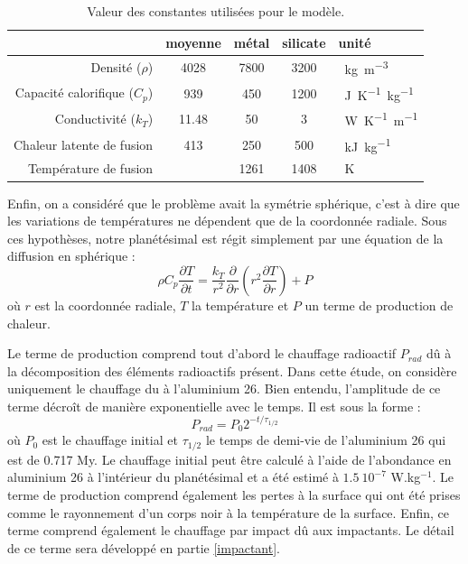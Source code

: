 \documentclass[10pt,a4paper]{article}
\numberwithin{equation}{section}
\begin{document}
\tabulinesep=0.3mm
\begin{table}[h!]
  \center
  \begin{tabu}{ r | c c c l}
     & moyenne & métal & silicate & unité\\ \hline
    Densité ($\rho$) & 4028 & 7800 &  3200 & \SI{}{kg.m^{-3}}\\ \hline
    Capacité calorifique ($C_p$) & 939 & 450 & 1200 &  \SI{}{J.K^{-1}.kg^{-1}} \\ \hline
    Conductivité ($k_T$)& 11.48 & 50 & 3 & \SI{}{W.K^{-1}.m^{-1}}  \\ \hline    
    Chaleur latente de fusion & 413 & 250 & 500 & \SI{}{kJ.kg^{-1}}\\ \hline
    Température de fusion & & 1261 & 1408 & \SI{}{K}\\ \hline
  \end{tabu}
  \caption{Valeur des constantes utilisées pour le modèle.}
  \label{constantes}
\end{table}

Enfin, on a considéré que le problème avait la symétrie sphérique, c'est à dire que les variations de températures ne dépendent que de la coordonnée radiale. Sous ces hypothèses, notre planétésimal est régit simplement par une équation de la diffusion en sphérique :
\begin{equation}
\rho C_p \dfrac{\partial T}{\partial t} = \frac{k_{T}}{r^2} \dfrac{\partial }{\partial r}\left( r^2 \dfrac{\partial T}{\partial r} \right) + P
\label{diffusion}
\end{equation}
où $r$ est la coordonnée radiale, $T$ la température et $P$ un terme de production de chaleur.
\medskip

Le terme de production comprend tout d'abord le chauffage radioactif $P_{rad}$ dû à la décomposition des éléments radioactifs présent. Dans cette étude, on considère uniquement le chauffage du à l'aluminium 26. Bien entendu, l'amplitude de ce terme décroît de manière exponentielle avec le temps. Il est sous la forme :
\begin{equation}
P_{rad} = P_{0}2^{-t/\tau_{1/2}}
\end{equation}
où $P_{0}$ est le chauffage initial et $\tau_{1/2}$ le temps de demi-vie de l'aluminium 26 qui est de 0.717 My. Le chauffage initial peut être calculé à l'aide de l'abondance en aluminium 26 à l'intérieur du planétésimal et a été estimé à $1.5\ 10^{-7}$ W.kg$^{-1}$.
Le terme de production comprend également les pertes à la surface qui ont été prises comme le rayonnement d'un corps noir à la température de la surface.
Enfin, ce terme comprend également le chauffage par impact dû aux impactants. Le détail de ce terme sera développé en partie \ref{impactant}.
\medskip
\end{document}
